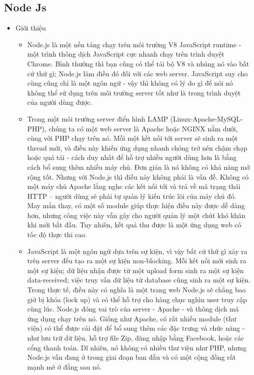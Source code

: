 \documentclass[12pt]{article}
\begin{document}
\subsection{Node Js}
\begin{itemize}
\item	Giới thiệu
\begin{itemize}
 \item Node.js là một nền tảng chạy trên môi trường V8 JavaScript runtime - một trình thông dịch JavaScript cực nhanh chạy trên trình duyệt Chrome. Bình thường thì bạn cũng có thể tải bộ V8 và nhúng nó vào bất cứ thứ gì; Node.js làm điều đó đối với các web server. JavaScript suy cho cùng cũng chỉ là một ngôn ngữ - vậy thì không có lý do gì để nói nó không thể sử dụng trên môi trường server tốt như là trong trình duyệt của người dùng được.
 \item Trong một môi trường server điển hình LAMP (Linux-Apache-MySQL-PHP), chúng ta có một web server là Apache hoặc NGINX nằm dưới, cùng với PHP chạy trên nó. Mỗi một kết nối tới server sẽ sinh ra một thread mới, và điều này khiến ứng dụng nhanh chóng trở nên chậm chạp hoặc quá tải - cách duy nhất để hỗ trợ nhiều người dùng hơn là bằng cách bổ sung thêm nhiều máy chủ. Đơn giản là nó không có khả năng mở rộng tốt. Nhưng với Node.js thì điều này không phải là vấn đề. Không có một máy chủ Apache lắng nghe các kết nối tới và trả về mã trạng thái HTTP – người dùng sẽ phải tự quản lý kiến trúc lõi của máy chủ đó. May mắn thay, có một số module giúp thực hiện điều này được dễ dàng hơn, nhưng công việc này vẫn gây cho người quản lý một chút khó khăn khi mới bắt đầu. Tuy nhiên, kết quả thu được là một ứng dụng web có tốc độ thực thi cao.
 \item JavaScript là một ngôn ngữ dựa trên sự kiện, vì vậy bất cứ thứ gì xảy ra trên server đều tạo ra một sự kiện non-blocking. Mỗi kết nối mới sinh ra một sự kiện; dữ liệu nhận được từ một upload form sinh ra một sự kiện data-received; việc truy vấn dữ liệu từ database cũng sinh ra một sự kiện. Trong thực tế, điều này có nghĩa là một trang web Node.js sẽ chẳng bao giờ bị khóa (lock up) và có thể hỗ trợ cho hàng chục nghìn user truy cập cùng lúc. Node.js đóng vai trò của server - Apache - và thông dịch mã ứng dụng chạy trên nó. Giống như Apache, có rất nhiều module (thư viện) có thể được cài đặt để bổ sung thêm các đặc trưng và chức năng - như lưu trữ dữ liệu, hỗ trợ file Zip, đăng nhập bằng Facebook, hoặc các cổng thanh toán. Dĩ nhiên, nó không có nhiều thư viện như PHP, nhưng Node.js vẫn đang ở trong giai đoạn ban đầu và có một cộng đồng rất mạnh mẽ ở đằng sau nó.

\end{itemize}
\end{itemize}
\end{document}

